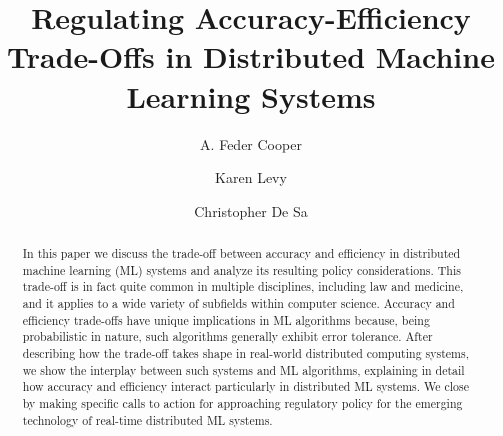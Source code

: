 \documentclass[sigplan,screen]{acmart}
\begin{document}

\title{Regulating Accuracy-Efficiency Trade-Offs in Distributed Machine Learning Systems}

\author{A. Feder Cooper}

\author{Karen Levy}
\author{Christopher De Sa}
\renewcommand{\shortauthors}{Cooper, et. al.}

\begin{abstract}
In this paper we discuss the trade-off between accuracy and efficiency in distributed machine learning (ML) systems and analyze its resulting policy considerations. This trade-off is in fact quite common in multiple disciplines, including law and medicine, and it applies to a wide variety of subfields within computer science. Accuracy and efficiency trade-offs have unique implications in ML algorithms because, being probabilistic in nature, such algorithms generally exhibit error tolerance. After describing how the trade-off takes shape in real-world distributed computing systems, we show the interplay between such systems and ML algorithms, explaining in detail how accuracy and efficiency interact particularly in distributed ML systems.  We close by making specific calls to action for approaching regulatory policy for the emerging technology of real-time distributed ML systems.
\end{abstract}

\maketitle
\end{document}
